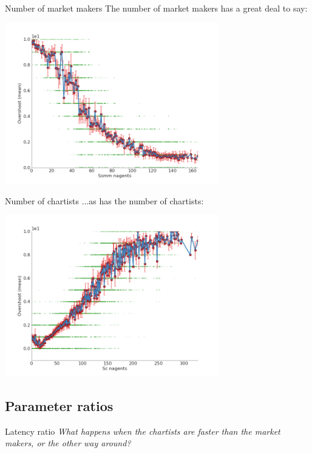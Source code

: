 \documentclass[14pt]{beamer}
\begin{document}
\begin{frame}{Number of market makers}
The number of market makers has a great deal to say:
\begin{center}
\includegraphics[width=0.7\textwidth]{scatter/ssmm_nAgents__vs__overshoot(mean)_scatter.png}
\end{center}
\end{frame}

\begin{frame}{Number of chartists}
...as has the number of chartists:
\begin{center}
\includegraphics[width=0.7\textwidth]{scatter/sc_nAgents__vs__overshoot(mean)_scatter.png}
\end{center}
\end{frame}

\subsection{Parameter ratios}
\begin{frame}
\tableofcontents[currentsubsection]
\end{frame}

\begin{frame}{Latency ratio}
\textit{What happens when the chartists are faster than the market makers, or the other way around?}
\end{frame}
\end{document}
